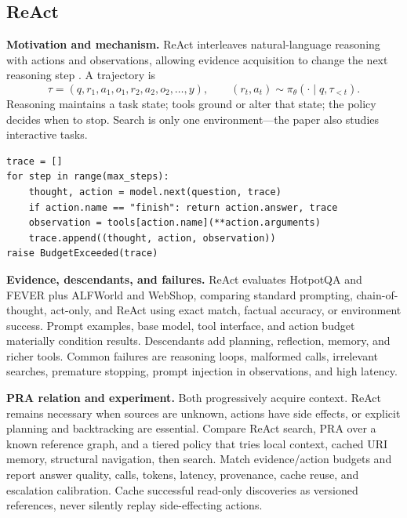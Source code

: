 \subsection{ReAct}

\textbf{Motivation and mechanism.} ReAct interleaves natural-language reasoning with
actions and observations, allowing evidence acquisition to change the next reasoning step
\citep{yao2023react}.  A trajectory is
\begin{equation}
\tau=(q,r_1,a_1,o_1,r_2,a_2,o_2,\ldots,y),\qquad
(r_t,a_t)\sim\pi_\theta(\cdot\mid q,\tau_{<t}).
\end{equation}
Reasoning maintains a task state; tools ground or alter that state; the policy decides when
to stop.  Search is only one environment---the paper also studies interactive tasks.

\begin{lstlisting}[caption={ReAct execution loop with an explicit budget}]
trace = []
for step in range(max_steps):
    thought, action = model.next(question, trace)
    if action.name == "finish": return action.answer, trace
    observation = tools[action.name](**action.arguments)
    trace.append((thought, action, observation))
raise BudgetExceeded(trace)
\end{lstlisting}

\textbf{Evidence, descendants, and failures.} ReAct evaluates HotpotQA and FEVER plus
ALFWorld and WebShop, comparing standard prompting, chain-of-thought, act-only, and ReAct
using exact match, factual accuracy, or environment success.  Prompt examples, base model,
tool interface, and action budget materially condition results.  Descendants add planning,
reflection, memory, and richer tools.  Common failures are reasoning loops, malformed calls,
irrelevant searches, premature stopping, prompt injection in observations, and high latency.

\textbf{PRA relation and experiment.} Both progressively acquire context.  ReAct remains
necessary when sources are unknown, actions have side effects, or explicit planning and
backtracking are essential.  Compare ReAct search, PRA over a known reference graph, and a
tiered policy that tries local context, cached URI memory, structural navigation, then search.
Match evidence/action budgets and report answer quality, calls, tokens, latency, provenance,
cache reuse, and escalation calibration.  Cache successful read-only discoveries as versioned
references, never silently replay side-effecting actions.

